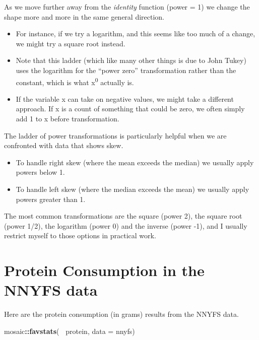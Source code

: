 \documentclass[
]{book}
\newenvironment{Shaded}{\begin{snugshade}}{\end{snugshade}}
\newcommand{\DataTypeTok}[1]{\textcolor[rgb]{0.13,0.29,0.53}{#1}}
\newcommand{\KeywordTok}[1]{\textcolor[rgb]{0.13,0.29,0.53}{\textbf{#1}}}
\newcommand{\NormalTok}[1]{#1}
\newcommand{\OperatorTok}[1]{\textcolor[rgb]{0.81,0.36,0.00}{\textbf{#1}}}
\newcommand{\StringTok}[1]{\textcolor[rgb]{0.31,0.60,0.02}{#1}}
\providecommand{\tightlist}{%
  \setlength{\itemsep}{0pt}\setlength{\parskip}{0pt}}
\begin{document}
As we move further away from the \emph{identity} function (power = 1) we change the shape more and more in the same general direction.

\begin{itemize}
\tightlist
\item
  For instance, if we try a logarithm, and this seems like too much of a change, we might try a square root instead.
\item
  Note that this ladder (which like many other things is due to John Tukey) uses the logarithm for the ``power zero'' transformation rather than the constant, which is what x\textsuperscript{0} actually is.
\item
  If the variable x can take on negative values, we might take a different approach. If x is a count of something that could be zero, we often simply add 1 to x before transformation.
\end{itemize}

The ladder of power transformations is particularly helpful when we are confronted with data that shows skew.

\begin{itemize}
\tightlist
\item
  To handle right skew (where the mean exceeds the median) we usually apply powers below 1.
\item
  To handle left skew (where the median exceeds the mean) we usually apply powers greater than 1.
\end{itemize}

The most common transformations are the square (power 2), the square root (power 1/2), the logarithm (power 0) and the inverse (power -1), and I usually restrict myself to those options in practical work.

\hypertarget{protein-consumption-in-the-nnyfs-data}{%
\section{Protein Consumption in the NNYFS data}\label{protein-consumption-in-the-nnyfs-data}}

Here are the protein consumption (in grams) results from the NNYFS data.

\begin{Shaded}
\begin{Highlighting}[]
\NormalTok{mosaic}\OperatorTok{::}\KeywordTok{favstats}\NormalTok{(}\OperatorTok{~}\StringTok{ }\NormalTok{protein, }\DataTypeTok{data =}\NormalTok{ nnyfs)}
\end{Highlighting}
\end{Shaded}
\end{document}
